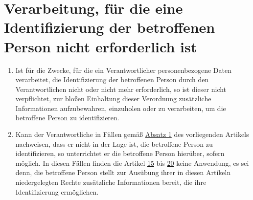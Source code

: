 \chapter{Verarbeitung, für die eine Identifizierung der betroffenen Person nicht erforderlich ist}
\label{ch:11}


\begin{enumerate}

  \item Ist für die Zwecke, für die ein Verantwortlicher personenbezogene Daten verarbeitet, die Identifizierung der
   betroffenen Person durch den Verantwortlichen nicht oder nicht mehr erforderlich, so ist dieser nicht verpflichtet,
   zur bloßen Einhaltung dieser Verordnung zusätzliche Informationen aufzubewahren, einzuholen oder zu verarbeiten, um
   die betroffene Person zu identifizieren.
  \label{itm:11-1}

  \item Kann der Verantwortliche in Fällen gemäß \hyperref[itm:11-1]{Absatz 1} des vorliegenden Artikels nachweisen,
   dass er nicht in der Lage ist, die betroffene Person zu identifizieren, so unterrichtet er die betroffene Person
   hierüber, sofern möglich. In diesen Fällen finden die Artikel \hyperref[ch:15]{15} bis \hyperref[ch:20]{20} keine
   Anwendung, es sei denn, die betroffene Person stellt zur Ausübung ihrer in diesen Artikeln niedergelegten Rechte
   zusätzliche Informationen bereit, die ihre Identifizierung ermöglichen.
  \label{itm:11-2}

\end{enumerate}


